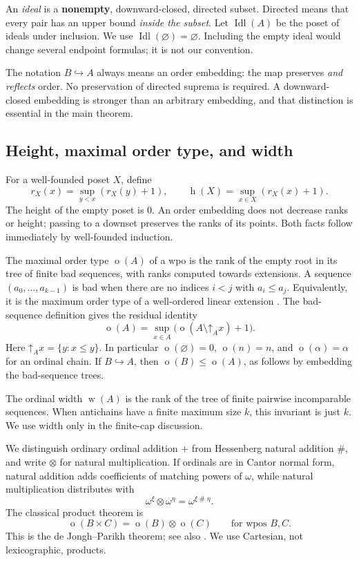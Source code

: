 \documentclass[11pt,letterpaper]{article}
\theoremstyle{teal}
\theoremstyle{definition}
\newcommand{\Idl}{\operatorname{Idl}}
\newcommand{\hgt}{\operatorname{h}}
\newcommand{\mot}{\operatorname{o}}
\newcommand{\wid}{\operatorname{w}}
\newcommand{\emb}{\hookrightarrow}
\newcommand{\nsum}{\mathbin{\#}}
\newcommand{\up}{\mathord\uparrow}
\begin{document}
An \emph{ideal} is a \textbf{nonempty}, downward-closed, directed subset. Directed means that every pair has an upper bound \emph{inside the subset}. Let $\Idl(A)$ be the poset of ideals under inclusion. We use $\Idl(\varnothing)=\varnothing$. Including the empty ideal would change several endpoint formulas; it is not our convention.

The notation $B\emb A$ always means an order embedding: the map preserves \emph{and reflects} order. No preservation of directed suprema is required. A downward-closed embedding is stronger than an arbitrary embedding, and that distinction is essential in the main theorem.

\subsection{Height, maximal order type, and width}
For a well-founded poset $X$, define
\[
 r_X(x)=\sup_{y<x}(r_X(y)+1),\qquad
 \hgt(X)=\sup_{x\in X}(r_X(x)+1).
\]
The height of the empty poset is $0$. An order embedding does not decrease ranks or height; passing to a downset preserves the ranks of its points. Both facts follow immediately by well-founded induction.

The maximal order type $\mot(A)$ of a wpo is the rank of the empty root in its tree of finite bad sequences, with ranks computed towards extensions. A sequence $(a_0,\ldots,a_{k-1})$ is bad when there are no indices $i<j$ with $a_i\leq a_j$. Equivalently, it is the maximum order type of a well-ordered linear extension \cite{deJonghParikh,DSS}. The bad-sequence definition gives the residual identity
\begin{equation}\label{eq:badresidual}
 \mot(A)=\sup_{x\in A}\bigl(\mot(A\setminus\up_Ax)+1\bigr).
\end{equation}
Here $\up_Ax=\{y:x\leq y\}$. In particular $\mot(\varnothing)=0$, $\mot(n)=n$, and $\mot(\alpha)=\alpha$ for an ordinal chain. If $B\emb A$, then $\mot(B)\leq\mot(A)$, as follows by embedding the bad-sequence trees.

The ordinal width $\wid(A)$ is the rank of the tree of finite pairwise incomparable sequences. When antichains have a finite maximum size $k$, this invariant is just $k$. We use width only in the finite-cap discussion.

We distinguish ordinary ordinal addition $+$ from Hessenberg natural addition $\nsum$, and write $\otimes$ for natural multiplication. If ordinals are in Cantor normal form, natural addition adds coefficients of matching powers of $\omega$, while natural multiplication distributes with
\[
 \omega^\xi\otimes\omega^\eta=\omega^{\xi\nsum\eta}.
\]
The classical product theorem is
\begin{equation}\label{eq:natural-product}
 \mot(B\times C)=\mot(B)\otimes\mot(C)
 \qquad\text{for wpos $B,C$}.
\end{equation}
This is the de Jongh--Parikh theorem; see also \cite[Lemma~4.5]{DSS}. We use Cartesian, not lexicographic, products.
\end{document}

